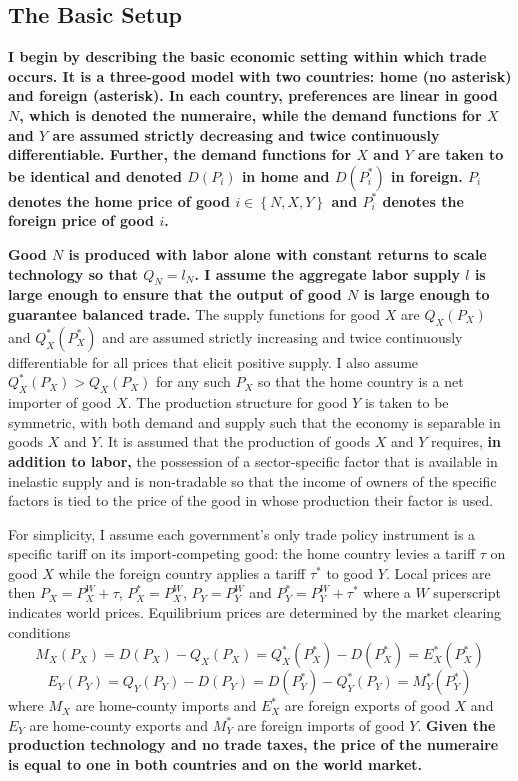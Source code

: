 \documentclass[10pt]{article}
\begin{document}
\subsection{The Basic Setup}
\label{sec:basic}
\textbf{I begin by describing the basic economic setting within which trade occurs. It is a three-good model with two countries: home (no asterisk) and foreign (asterisk). In each country, preferences are linear in good $N$, which is denoted the numeraire, while the demand functions for $X$ and $Y$ are assumed strictly decreasing and twice continuously differentiable. Further, the demand functions for $X$ and $Y$ are taken to be identical and denoted $D(P_i)$ in home and $D(P_i^*)$ in foreign. $P_i$ denotes the home price of good $i \in \left\{N,X,Y\right\}$ and $P_i^*$ denotes the foreign price of good $i$.}

\textbf{Good $N$ is produced with labor alone with constant returns to scale technology so that $Q_N = l_N$. I assume the aggregate labor supply $l$ is large enough to ensure that the output of good $N$ is large enough to guarantee balanced trade.} The supply functions for good $X$ are $Q_X(P_X)$ and $Q_X^*(P_X^*)$ and are assumed strictly increasing and twice continuously differentiable for all prices that elicit positive supply. I also assume $Q_X^*(P_X) > Q_X(P_X)$ for any such $P_X$ so that the home country is a net importer of good $X$. The production structure for good $Y$ is taken to be symmetric, with both demand and supply such that the economy is separable in goods $X$ and $Y$. It is assumed that the production of goods $X$ and $Y$ requires, \textbf{in addition to labor,} the possession of a sector-specific factor that is available in inelastic supply and is non-tradable so that the income of owners of the specific factors is tied to the price of the good in whose production their factor is used. 

For simplicity, I assume each government's only trade policy instrument is a specific tariff on its import-competing good: the home country levies a tariff $\tau$ on good $X$ while the foreign country applies a tariff $\tau^*$ to good $Y$. Local prices are then $P_X = P_X^W + \tau$, $P_X^* = P_X^W$, $P_Y = P_Y^W$ and $P_Y^* = P_Y^W + \tau^*$ where a $W$ superscript indicates world prices. Equilibrium prices are determined by the market clearing conditions
$$M_X(P_X)= D(P_X)-Q_X(P_X) = Q_X^*(P_X^*) - D(P_X^*) = E_X^*(P_X^*)$$
$$E_Y(P_Y)=Q_Y(P_Y)-D(P_Y) = D(P_Y^*)-Q_Y^*(P_Y) = M_Y^*(P_Y^*)$$
where $M_X$ are home-county imports and $E_X^*$ are foreign exports of good $X$ and $E_Y$ are home-county exports and $M_Y^*$ are foreign imports of good $Y$. \textbf{Given the production technology and no trade taxes, the price of the numeraire is equal to one in both countries and on the world market.}
\end{document}
